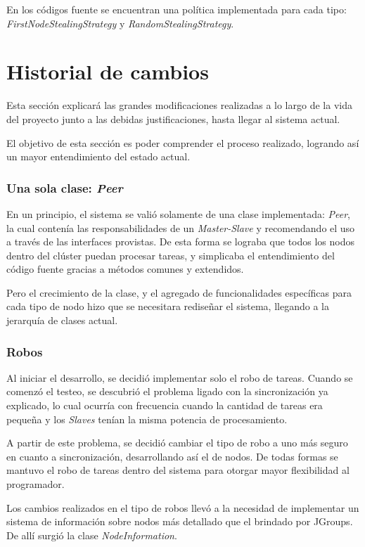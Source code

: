 \documentclass[12pt,a4paper,oneside,spanish]{report}
\begin{document}
En los códigos fuente se encuentran una política implementada para cada tipo: \textit{FirstNodeStealingStrategy}  y \textit{RandomStealingStrategy}.

\section*{Historial de cambios}

Esta sección explicará las grandes modificaciones realizadas a lo largo de la vida del proyecto junto a las debidas justificaciones, hasta llegar al sistema actual.

El objetivo de esta sección es poder comprender el proceso realizado, logrando así un mayor entendimiento del estado actual.

\subsubsection*{Una sola clase: \textit{Peer}}

En un principio, el sistema se valió solamente de una clase implementada: \textit{Peer}, la cual contenía las responsabilidades de un \textit{Master-Slave} y recomendando el uso a través de las interfaces provistas. De esta forma se lograba que todos los nodos dentro del clúster puedan procesar tareas, y simplicaba el entendimiento del código fuente gracias a métodos comunes y extendidos. 

Pero el crecimiento de la clase, y el agregado de funcionalidades específicas para cada tipo de nodo hizo que se necesitara rediseñar el sistema, llegando a la jerarquía de clases actual.

\subsubsection*{Robos}

Al iniciar el desarrollo, se decidió implementar solo el robo de tareas. Cuando se comenzó el testeo, se descubrió el problema ligado con la sincronización ya explicado, lo cual ocurría con frecuencia cuando la cantidad de tareas era pequeña y los \textit{Slaves} tenían la misma potencia de procesamiento.

A partir de este problema, se decidió cambiar el tipo de robo a uno más seguro en cuanto a sincronización, desarrollando así el de nodos. De todas formas se mantuvo el robo de tareas dentro del sistema para otorgar mayor flexibilidad al programador.

Los cambios realizados en el tipo de robos llevó a la necesidad de implementar un sistema de información sobre nodos más detallado que el brindado por JGroups. De allí surgió la clase \textit{NodeInformation}.
\end{document}
